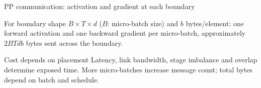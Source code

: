 \documentclass[handout]{beamer}
\begin{document}
\begin{frame}{PP communication: activation and gradient at each boundary}
  \begin{center}
  \end{center}
  \small For boundary shape $B\times T\times d$ ($B$: micro-batch size) and $b$ bytes/element: one forward activation and one backward gradient per micro-batch, approximately $2BTdb$ bytes sent across the boundary.
  \begin{alertblock}{Cost depends on placement}
    Latency, link bandwidth, stage imbalance and overlap determine exposed time. More micro-batches increase message count; total bytes depend on batch and schedule.
  \end{alertblock}
\end{frame}
\end{document}
